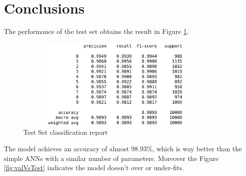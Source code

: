 \documentclass[11pt]{article}
\begin{document}
\section*{Conclusions}
The performance of the test set obtains the result in Figure \ref{fig:test}.
\begin{figure}[!h]
	\centering
	\includegraphics[width=10cm,height=4.5cm]{imgs/Test.png}
	\caption{Test Set classification report}
	\label{fig:test}
\end{figure}

The model achieves an accuracy of almost $98.93\%$, which is way better than the simple ANNs with a similar number of parameters. Moreover the Figure \ref{fig:valVsTest} indicates the model doesn't over or under-fits.
\end{document}

